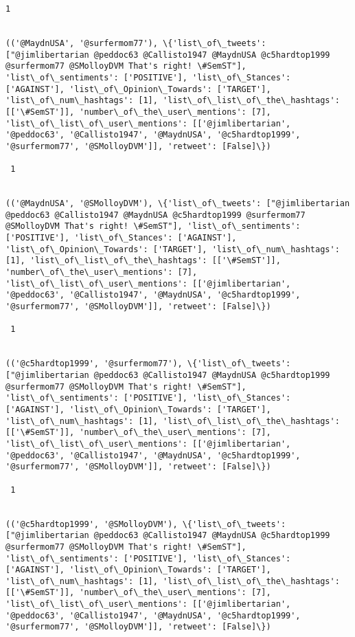 \documentclass[11pt]{article}
\begin{document}
\begin{Verbatim}[commandchars=\\\{\}]
 1
 

(('@MaydnUSA', '@surfermom77'), \{'list\_of\_tweets': ["@jimlibertarian @peddoc63 @Callisto1947 @MaydnUSA @c5hardtop1999 @surfermom77 @SMolloyDVM That's right! \#SemST"], 'list\_of\_sentiments': ['POSITIVE'], 'list\_of\_Stances': ['AGAINST'], 'list\_of\_Opinion\_Towards': ['TARGET'], 'list\_of\_num\_hashtags': [1], 'list\_of\_list\_of\_the\_hashtags': [['\#SemST']], 'number\_of\_the\_user\_mentions': [7], 'list\_of\_list\_of\_user\_mentions': [['@jimlibertarian', '@peddoc63', '@Callisto1947', '@MaydnUSA', '@c5hardtop1999', '@surfermom77', '@SMolloyDVM']], 'retweet': [False]\})

 1
 

(('@MaydnUSA', '@SMolloyDVM'), \{'list\_of\_tweets': ["@jimlibertarian @peddoc63 @Callisto1947 @MaydnUSA @c5hardtop1999 @surfermom77 @SMolloyDVM That's right! \#SemST"], 'list\_of\_sentiments': ['POSITIVE'], 'list\_of\_Stances': ['AGAINST'], 'list\_of\_Opinion\_Towards': ['TARGET'], 'list\_of\_num\_hashtags': [1], 'list\_of\_list\_of\_the\_hashtags': [['\#SemST']], 'number\_of\_the\_user\_mentions': [7], 'list\_of\_list\_of\_user\_mentions': [['@jimlibertarian', '@peddoc63', '@Callisto1947', '@MaydnUSA', '@c5hardtop1999', '@surfermom77', '@SMolloyDVM']], 'retweet': [False]\})

 1
 

(('@c5hardtop1999', '@surfermom77'), \{'list\_of\_tweets': ["@jimlibertarian @peddoc63 @Callisto1947 @MaydnUSA @c5hardtop1999 @surfermom77 @SMolloyDVM That's right! \#SemST"], 'list\_of\_sentiments': ['POSITIVE'], 'list\_of\_Stances': ['AGAINST'], 'list\_of\_Opinion\_Towards': ['TARGET'], 'list\_of\_num\_hashtags': [1], 'list\_of\_list\_of\_the\_hashtags': [['\#SemST']], 'number\_of\_the\_user\_mentions': [7], 'list\_of\_list\_of\_user\_mentions': [['@jimlibertarian', '@peddoc63', '@Callisto1947', '@MaydnUSA', '@c5hardtop1999', '@surfermom77', '@SMolloyDVM']], 'retweet': [False]\})

 1
 

(('@c5hardtop1999', '@SMolloyDVM'), \{'list\_of\_tweets': ["@jimlibertarian @peddoc63 @Callisto1947 @MaydnUSA @c5hardtop1999 @surfermom77 @SMolloyDVM That's right! \#SemST"], 'list\_of\_sentiments': ['POSITIVE'], 'list\_of\_Stances': ['AGAINST'], 'list\_of\_Opinion\_Towards': ['TARGET'], 'list\_of\_num\_hashtags': [1], 'list\_of\_list\_of\_the\_hashtags': [['\#SemST']], 'number\_of\_the\_user\_mentions': [7], 'list\_of\_list\_of\_user\_mentions': [['@jimlibertarian', '@peddoc63', '@Callisto1947', '@MaydnUSA', '@c5hardtop1999', '@surfermom77', '@SMolloyDVM']], 'retweet': [False]\})


\end{Verbatim}
\end{document}
